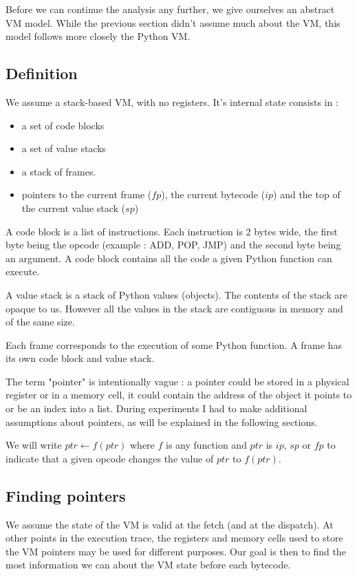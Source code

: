 \documentclass[french]{article}
\begin{document}
Before we can continue the analysis any further, we give ourselves an abstract VM model. While the previous section didn't assume much about the VM, this model follows more closely the Python VM.
\subsection{Definition}

We assume a stack-based VM, with no registers. It's internal state consists in :
\begin{itemize}
	\item a set of code blocks 
	\item a set of value stacks 
	\item a stack of frames.  
	\item pointers to the current frame ($fp$), the current bytecode ($ip$) and the top of the current value stack ($sp$)
\end{itemize}

A code block is a list of instructions. Each instruction is 2 bytes wide, the first byte being the opcode (example : ADD, POP, JMP) and the second byte being an argument. A code block contains all the code a given Python function can execute.

A value stack is a stack of Python values (objects). The contents of the stack are opaque to us. However all the values in the stack are contiguous in memory and of the same size.

Each frame corresponds to the execution of some Python function. A frame has its own code block and value stack.

The term "pointer" is intentionally vague : a pointer could be stored in a physical register or in a memory cell, it could contain the address of the object it points to or be an index into a list. During experiments I had to make additional assumptions about pointers, as will be explained in the following sections.

We will write $ptr \leftarrow f(ptr)$ where $f$ is any function and $ptr$ is $ip$, $sp$ or $fp$ to indicate that a given opcode changes the value of $ptr$ to $f(ptr)$.

\subsection{Finding pointers}

We assume the state of the VM is valid at the fetch (and at the dispatch). At other points in the execution trace, the registers and memory cells used to store the VM pointers may be used for different purposes. Our goal is then to find the most information we can about the VM state before each bytecode.
\end{document}

